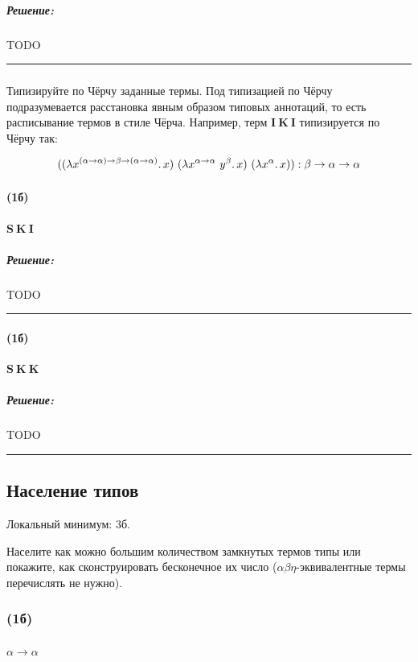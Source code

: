 \documentclass{article}
\newenvironment{proof}{\subparagraph{\hspace{-1em}Решение:\newline}\-}{\par\noindent\rule{\textwidth}{0.4pt}}
\newcommand{\term}[1]{\mathbf{#1}}
\newcommand{\ap}{~}
\begin{document}
    \begin{proof}
        TODO %
    \end{proof}

    \subsubsection{}

    Типизируйте по Чёрчу заданные термы.
    Под типизацией по Чёрчу подразумевается
    расстановка явным образом типовых аннотаций, то есть расписывание термов в стиле
    Чёрча.
    Например, терм $\term{I} \ap \term{K} \ap \term{I}$ типизируется по Чёрчу
    так:

    \[((\lambda x^{(\alpha \to \alpha) \to \beta \to (\alpha \to \alpha)}\ldotp x) \ap (\lambda x^{\alpha \to \alpha} \ap y^\beta\ldotp x) \ap (\lambda x^\alpha\ldotp x)):
    \beta \to \alpha \to \alpha\]

    \paragraph{(1б)} $\term{S} \ap \term{K} \ap \term{I}$

    \begin{proof}
        TODO %
    \end{proof}

    \paragraph{(1б)} $\term{S} \ap \term{K} \ap \term{K}$

    \begin{proof}
        TODO %
    \end{proof}

    \subsection{Население типов}

    Локальный минимум: 3б.

    Населите как можно большим количеством замкнутых термов типы или покажите, как
    сконструировать бесконечное их число ($\alpha\beta\eta$-эквивалентные
    термы перечислять не нужно).

    \subsubsection{(1б)}

    \paragraph{} $\alpha \to \alpha$
\end{document}
